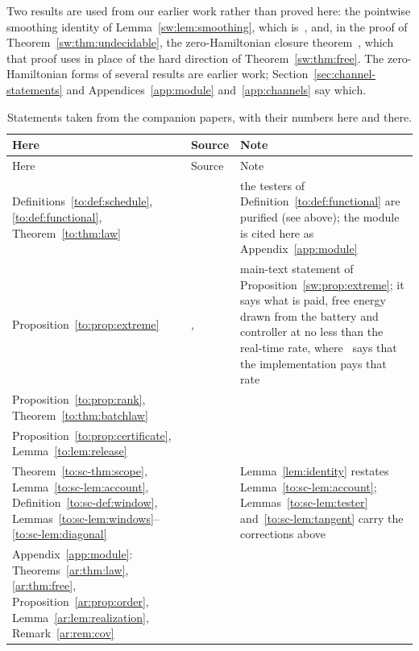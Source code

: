 Two results are used from our earlier work rather than proved here: the pointwise smoothing identity of Lemma~\ref{sw:lem:smoothing}, which is~\cite[Thm.~4.1 and Cor.~4.3]{Douglas26closed}, and, in the proof of Theorem~\ref{sw:thm:undecidable}, the zero-Hamiltonian closure theorem~\cite[Thm.~3.2(a)]{Memory}, which that proof uses in place of the hard direction of Theorem~\ref{sw:thm:free}. The zero-Hamiltonian forms of several results are earlier work; Section~\ref{sec:channel-statements} and Appendices~\ref{app:module} and~\ref{app:channels} say which.

\begin{small}
\begin{longtable}{@{}>{\raggedright\arraybackslash}p{}>{\raggedright\arraybackslash}p{}>{\raggedright\arraybackslash}p{}@{}}
\caption{Statements taken from the companion papers, with their numbers here and there.}\label{tab:companions}\\
\toprule
Here & Source & Note\\
\midrule
\endfirsthead
\toprule
Here & Source & Note\\
\midrule
\endhead
\bottomrule
\endfoot
Definitions~\ref{to:def:schedule}, \ref{to:def:functional}, Theorem~\ref{to:thm:law} & \cite[Defs.~1, 2, Thm.~1]{Order} & the testers of Definition~\ref{to:def:functional} are purified (see above); the module is cited here as Appendix~\ref{app:module}\\
Proposition~\ref{to:prop:extreme} & \cite[Prop.~2]{Order}, \cite[Prop.~8]{SaveWork} & main-text statement of Proposition~\ref{sw:prop:extreme}; it says what is paid, free energy drawn from the battery and controller at no less than the real-time rate, where~\cite[Prop.~2]{Order} says that the implementation pays that rate\\
Proposition~\ref{to:prop:rank}, Theorem~\ref{to:thm:batchlaw} & \cite[Prop.~3, Thm.~4]{Order} & \\
Proposition~\ref{to:prop:certificate}, Lemma~\ref{to:lem:release} & \cite[Prop.~6, Lemma~5]{Order} & \\
Theorem~\ref{to:sc-thm:scope}, Lemma~\ref{to:sc-lem:account}, Definition~\ref{to:sc-def:window}, Lemmas~\ref{to:sc-lem:windows}--\ref{to:sc-lem:diagonal} & \cite[Thm.~7, Lemma~8, Def.~3, Lemmas~9--15]{Order} & Lemma~\ref{lem:identity} restates Lemma~\ref{to:sc-lem:account}; Lemmas~\ref{to:sc-lem:tester} and~\ref{to:sc-lem:tangent} carry the corrections above\\
Appendix~\ref{app:module}: Theorems~\ref{ar:thm:law}, \ref{ar:thm:free}, Proposition~\ref{ar:prop:order}, Lemma~\ref{ar:lem:realization}, Remark~\ref{ar:rem:cov} & \cite[Thms.~1, 2, Prop.~3, Lemma~4, Remark~1]{Answering} & \\

\end{longtable}
\end{small}

